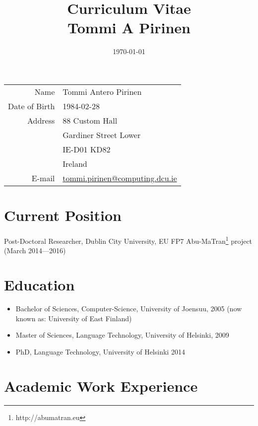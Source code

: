 \documentclass[a4paper]{article}
\title{Curriculum Vitae\\
\small{Tommi A Pirinen}}
\date{\today}
\begin{document}
\maketitle

\begin{tabular}{rl}
Name & Tommi Antero Pirinen \\
Date of Birth & 1984-02-28 \\
Address & 88 Custom Hall \\
& Gardiner Street Lower \\
& IE-D01 KD82\\
& Ireland \\
E-mail & \url{tommi.pirinen@computing.dcu.ie} \\
\end{tabular}


\section{Current Position}

Post-Doctoral Researcher, Dublin City University, EU FP7 Abu-MaTran\footnote{http://abumatran.eu} project (March 2014---2016)

\section{Education}

\begin{itemize}
\item Bachelor of Sciences, Computer-Science, University of Joensuu, 2005 (now known as: University of East Finland)
\item Master of Sciences, Language Technology, University of Helsinki, 2009
\item PhD, Language Technology, University of Helsinki 2014
\end{itemize}



\section{Academic Work Experience}
\end{document}
